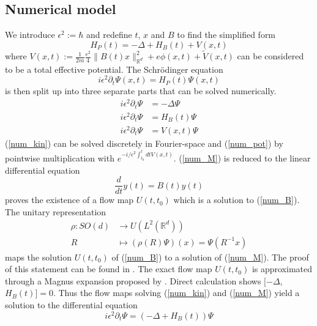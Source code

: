 \documentclass{article}
\begin{document}
\subsection{Numerical model}
We introduce $\epsilon ^2 := \hbar$ and redefine $t$, $x$ and $B$ to find the simplified form
\begin{equation}
  H_P(t) = -\Delta + H_B(t) + V(x,t)
\end{equation}
where $V(x,t) := \frac{1}{2m}\frac{e^{2}}{4}\|B(t) x\|_{\mathbb{R}^{d}}^{2} + e \phi(x,t) + \tilde{V}(x,t)$ can be considered to be a total effective potential.
The Schr{\"o}dinger equation
\begin{equation} \label{num_main} \tag{H}
  i \epsilon ^2 \partial_t \Psi(x, t) = H_P(t)\Psi(x,t)
\end{equation}
is then split up into three separate parts that can be solved numerically.
\begin{align}
  i \epsilon^2 \partial_t \Psi &= -\Delta \Psi \label{num_kin} \tag{K}\\
  i \epsilon^2 \partial_t \Psi &= H_B(t) \Psi \label{num_M} \tag{M}\\
  i \epsilon^2 \partial_t \Psi &= V(x,t) \Psi \label{num_pot} \tag{P}
\end{align}
(\ref{num_kin}) can be solved discretely in Fourier-space and (\ref{num_pot}) by pointwise multiplication with $e^{-i/\epsilon ^2 \int_{t_0}^t dt V(x,t)}$. (\ref{num_M}) is reduced to the linear differential equation
\begin{equation} \label{num_B} \tag{B}
  \frac{d}{dt}y(t) = B(t)y(t)
\end{equation}
\cite{simon_reed} proves the existence of a flow map $U(t,t_0)$ which is a solution to (\ref{num_B}). The unitary representation
\begin{align} \label{eq_rho}
  \rho : SO(d) &\longrightarrow U(L^2(\mathbb{R}^d)) \\
  R &\longmapsto (\rho (R)\Psi)(x) = \Psi(R^{-1} x)
\end{align}
maps the solution $U(t, t_0)$ of (\ref{num_B}) to a solution of (\ref{num_M}). The proof of this statement can be found in \cite{paper_orvg}. The exact flow map $U(t, t_0)$ is approximated through a Magnus expansion proposed by \cite{magnus_integrators}.
Direct calculation shows  $[-\Delta$, $H_B(t)] = 0$. Thus the flow maps solving (\ref{num_kin}) and (\ref{num_M}) yield a solution to the differential equation
\begin{equation} \label{num_K_M} \tag{K+M}
  i \epsilon ^2 \partial_t \Psi = (-\Delta + H_B(t))\Psi
\end{equation}
\end{document}
